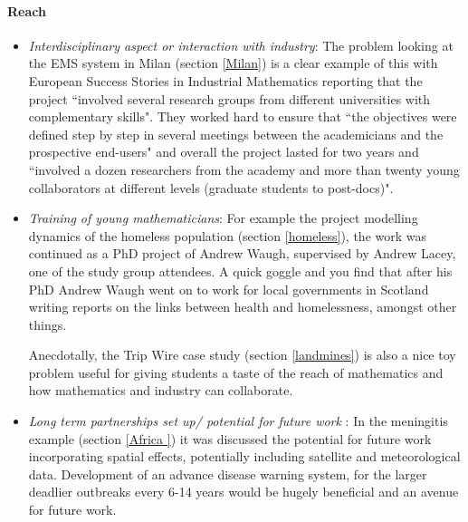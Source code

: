 \documentclass[11pt]{article} %
\begin{document}
\paragraph{Reach}
\begin{itemize}
	\item \textit{Interdisciplinary aspect or interaction with industry}: The problem looking at the EMS system in Milan (section \ref{Milan}) is a clear example of this with European Success Stories in Industrial Mathematics \cite{European2011} reporting that the project ``involved several research groups from different universities with complementary skills". They worked hard to ensure that ``the objectives were defined step by step in several meetings between the academicians and the prospective end-users" and overall the project lasted for two years and ``involved a dozen researchers from the academy and more than twenty young collaborators at different levels (graduate students to post-docs)".
	\item \textit{Training of young mathematicians}: For example the project modelling dynamics of the homeless population (section \ref{homeless}), the work was continued as a PhD project of Andrew Waugh, supervised by Andrew Lacey, one of the study group attendees. A quick goggle and you find that after his PhD Andrew Waugh went on to work for local governments in Scotland writing reports on the links between health and homelessness, amongst other things.
	
	Anecdotally, the Trip Wire case study (section \ref{landmines}) is also a nice toy problem useful for giving students a taste of the reach of mathematics and how mathematics and industry can collaborate. 
	\item \textit{Long term partnerships set up/ potential for future work }: In the meningitis example (section \ref{Africa }) it was discussed the potential for future work incorporating  spatial effects, potentially including satellite and meteorological data. Development of an advance disease warning system, for the larger deadlier outbreaks every 6-14 years would be hugely beneficial and an avenue for future work. 
\end{itemize}
	 
\end{document}
